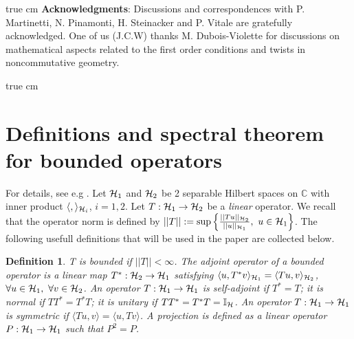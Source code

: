 \documentclass[a4paper,11pt,twoside]{article}
\numberwithin{equation}{section}
\newcommand\bbone{{ \mathbb{I}}}
\newtheorem{adefinition}{Definition}
\theoremstyle{nonumberplain}
\begin{document}

 true cm
{\bf{Acknowledgments}}: Discussions and correspondences with P. Martinetti, N. Pinamonti, H. Steinacker and P. Vitale are gratefully acknowledged. One of us (J.C.W) thanks M. Dubois-Violette for discussions on mathematical aspects related to the first order conditions and twists in noncommutative geometry.


 true cm

\setcounter{section}{0}
\appendix



\section{Definitions and spectral theorem for bounded operators}\label{appendix1}

For details, see e.g \cite{orthop-1}. Let ${\cal{H}}_1$ and ${\cal{H}}_2$ be 2 separable Hilbert spaces on $\mathbb{C}$ with inner product $\langle, \rangle_{{\cal{H}}_i}$, $i=1,2$. Let $T:{\cal{H}}_1\to{\cal{H}}_2$ be a {\it{linear}} operator. We recall that the operator norm is defined by $||T||:=\sup\left\{\frac{||Tu||_{{\cal{H}}_2}}{||u||_{{\cal{H}}_1}},\ u\in{\cal{H}}_1 \right\}$. The following usefull definitions that will be used in the paper are collected below.

\begin{adefinition}
T is bounded if $||T||<\infty$. The adjoint operator of a bounded operator is a linear map $T^*:{\cal{H}}_2\to{\cal{H}}_1$ satisfying $\langle u, T^*v\rangle_{{\cal{H}}_1}=\langle Tu,v \rangle_{{\cal{H}}_2}$, $\forall u\in{\cal{H}}_1,\ \forall v\in{\cal{H}}_2$. An operator $T:{\cal{H}}_1\to{\cal{H}}_1$ is 
self-adjoint if $T^*=T$; it is normal if $TT^*=T^*T$; it is unitary if $TT^*=T^*T=\bbone_{\cal{H}}$. An operator $T:{\cal{H}}_1\to{\cal{H}}_1$ is symmetric if $\langle Tu,v \rangle=\langle u,Tv\rangle$. A projection is defined as a linear operator $P:{\cal{H}}_1\to{\cal{H}}_1$ such that $P^2=P$.
\end{adefinition}
\end{document}
